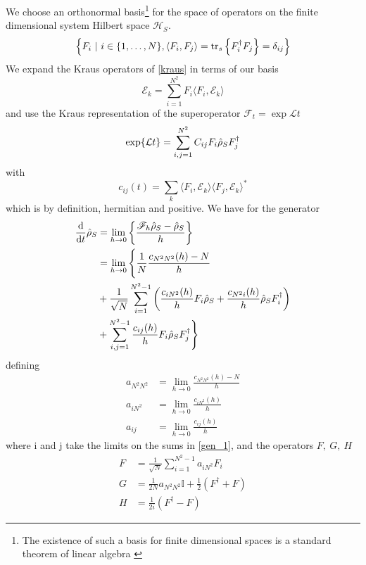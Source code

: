 We choose an orthonormal basis\footnote{ The existence of such a basis for finite dimensional spaces is a standard theorem of linear algebra \cite{Dummit1986}} for the space of operators on the finite dimensional system Hilbert space $\mathcal{H}_S$.
\begin{equation}
  \left\{F_i \ | \ i \in \{1, \dots , N \}, \langle F_i, F_j \rangle = \tr_s\left\{F_i^\dagger F_j\right\} = \delta_{ij} \right\}
\end{equation}
We expand the Kraus operators of \cref{kraus} in terms of our basis
\begin{equation}
  \mathscr{E}_k = \sum_{i=1}^{N^2} F_i \langle F_i, \mathscr{E}_k \rangle
\end{equation}
and use the Kraus representation of the superoperator $\mathscr{F}_t = \exp{\mathcal{L}t}$
\begin{equation}
  \exp{\mathcal{L}t} = \sum_{i, j=1}^{N^2} C_{ij} F_i \hat{\rho}_S F_j^\dagger
\end{equation}
with 
\begin{equation}
  c_{ij}(t) = \sum_k \langle F_i, \mathscr{E}_k \rangle \langle F_j, \mathscr{E}_k \rangle^*
\end{equation}
which is by definition, hermitian and positive. 
We have for the generator
\begin{align}
  \dv{t}\hat{\rho}_S &= \lim_{h \rightarrow 0} \left\{ \frac{\mathscr{F}_h \hat{\rho}_S - \hat{\rho}_S}{h} \right\}\nonumber\\
                &= \lim_{h \rightarrow 0} \Bigg\{ \frac{1}{N}\frac{c_{N^2N^2}(h) - N}{h} \nonumber\\
                &+ \frac{1}{\sqrt{N}}\sum^{N^2-1}_{i=1} \left(\frac{c_{iN^2}(h)}{h}F_i\hat{\rho}_S + \frac{c_{N^2i}(h)}{h}\hat{\rho}_SF_i^\dagger \right) \nonumber\\
                &+ \sum_{i, j = 1}^{N^2-1} \frac{c_{ij}(h)}{h}F_i \hat{\rho}_S F_j^\dagger \Bigg\}
  \label{gen_1}
\end{align}
defining
\begin{align*}
  a_{N^2N^2} &= \lim_{h \rightarrow 0} \frac{c_{N^2N^2}(h) - N}{h}\\
  a_{iN^2} &= \lim_{h \rightarrow 0} \frac{c_{iN^2}(h)}{h} \\
  a_{ij} &= \lim_{h \rightarrow 0} \frac{c_{ij}(h)}{h}
\end{align*}
where i and j take the limits on the sums in \cref{gen_1}, and the operators $F,\ G,\ H$
\begin{align*}
  F &= \frac{1}{\sqrt{N}} \sum_{i=1}^{N^2-1}a_{iN^2}F_i\\
  G &= \frac{1}{2N}a_{N^2N^2}\mathbb{I} + \frac{1}{2}\left(F^\dagger + F\right)\\
  H &= \frac{1}{2i}\left(F^\dagger - F \right)
\end{align*}
